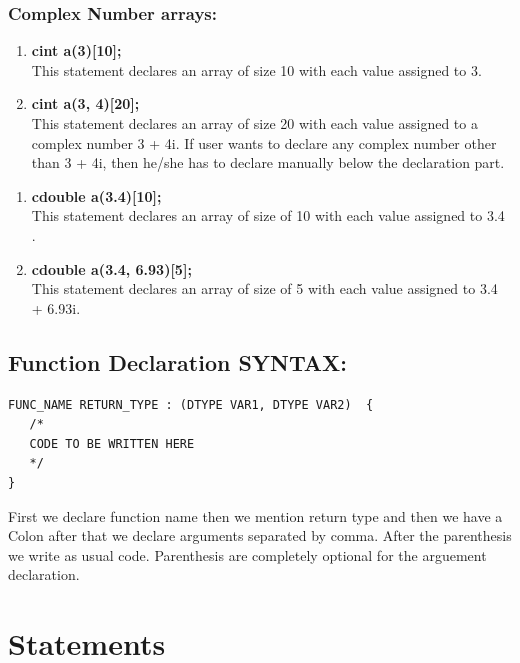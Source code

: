 \documentclass[12pt]{article}
\begin{document}
\subsubsection{Complex Number arrays:}
 \begin{enumerate}
     \item \textbf{cint a(3)[10];} \\
This statement declares an array of size 10 with each value assigned to 3.
     \item  \textbf{cint a(3, 4)[20];}\\ 
This statement declares an array of size 20 with each value assigned to a complex number 3 + 4i. If user wants to declare any complex number other 
than 3 + 4i, then he/she has to declare manually below the declaration part.
 \end{enumerate}
 \begin{enumerate}
    \item \textbf{cdouble a(3.4)[10];} \\
This statement declares an array of size of 10 with each value assigned to 3.4 .
\item \textbf{cdouble a(3.4, 6.93)[5];} \\
This statement declares an array of size of 5 with each value assigned to 3.4 + 6.93i.
 \end{enumerate}

\subsection{Function Declaration SYNTAX:}
    \begin{BVerbatim} 
FUNC_NAME RETURN_TYPE : (DTYPE VAR1, DTYPE VAR2)  {
   /*
   CODE TO BE WRITTEN HERE
   */
}
    \end{BVerbatim}

First we declare function name then we mention return type and then we have a Colon after that we declare arguments separated by comma. After the parenthesis we write as usual code. Parenthesis are completely optional for the arguement declaration.


\section{Statements}

\end{document}

